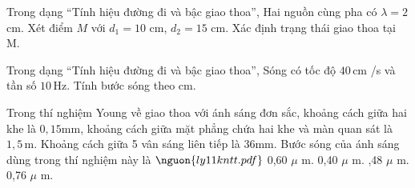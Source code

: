 \begin{ex}
Trong dạng “Tính hiệu đường đi và bậc giao thoa”, Hai nguồn cùng pha có $\lambda=2$ cm. Xét điểm $M$ với $d_1=10$ cm, $d_2=15$ cm. Xác định trạng thái giao thoa tại M.
\choiceTF

\end{ex}

\begin{ex}
Trong dạng “Tính hiệu đường đi và bậc giao thoa”, Sóng có tốc độ $40\,\text{cm}$ /s và tần số $10\,\text{Hz}$. Tính bước sóng theo cm.
\end{ex}

\begin{ex}
Trong thí nghiệm Young về giao thoa với ánh sáng đơn sắc, khoảng cách giữa hai khe là $0,15 \mathrm{mm}$, khoảng cách giữa mặt phẳng chứa hai khe và màn quan sát là $1,5\,\text{m}$. Khoảng cách giữa 5 vân sáng liên tiếp là $36 \mathrm{mm}$. Bước sóng của ánh sáng dùng trong thí nghiệm này là $\nguon{ly11 kntt.pdf}$
\choice
{0,60 $\mu$ m.}
{0,40 $\mu$ m.}
{,48 $\mu$ m.}
{0,76 $\mu$ m.}
\end{ex}

